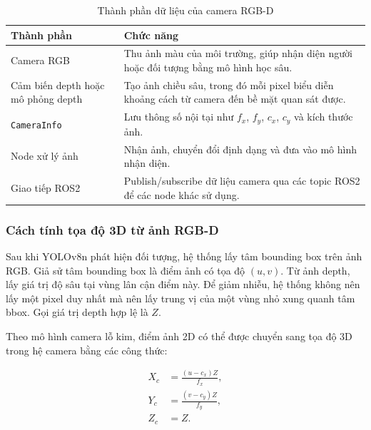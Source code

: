 \begin{table}[H]
    \centering
    \caption{Thành phần dữ liệu của camera RGB-D}
    \label{tab:rgbd-components}
    \renewcommand{\arraystretch}{1.25}
    \small
    \begin{tabularx}{\textwidth}{|>{\raggedright\arraybackslash}p{}|>{\raggedright\arraybackslash}X|}
        \hline
        \textbf{Thành phần} & \textbf{Chức năng} \\
        \hline
        Camera RGB & Thu ảnh màu của môi trường, giúp nhận diện người hoặc đối tượng bằng mô hình học sâu. \\
        \hline
        Cảm biến depth hoặc mô phỏng depth & Tạo ảnh chiều sâu, trong đó mỗi pixel biểu diễn khoảng cách từ camera đến bề mặt quan sát được. \\
        \hline
        \texttt{CameraInfo} & Lưu thông số nội tại như $f_x$, $f_y$, $c_x$, $c_y$ và kích thước ảnh. \\
        \hline
        Node xử lý ảnh & Nhận ảnh, chuyển đổi định dạng và đưa vào mô hình nhận diện. \\
        \hline
        Giao tiếp ROS2 & Publish/subscribe dữ liệu camera qua các topic ROS2 để các node khác sử dụng. \\
        \hline
    \end{tabularx}
\end{table}

\subsubsection{Cách tính tọa độ 3D từ ảnh RGB-D}
\label{subsubsec:rgbd-3d-calculation}

Sau khi YOLOv8n phát hiện đối tượng, hệ thống lấy tâm bounding box trên ảnh RGB. Giả sử tâm bounding box là điểm ảnh có tọa độ $(u, v)$. Từ ảnh depth, lấy giá trị độ sâu tại vùng lân cận điểm này. Để giảm nhiễu, hệ thống không nên lấy một pixel duy nhất mà nên lấy trung vị của một vùng nhỏ xung quanh tâm bbox. Gọi giá trị depth hợp lệ là $Z$.

Theo mô hình camera lỗ kim, điểm ảnh 2D có thể được chuyển sang tọa độ 3D trong hệ camera bằng các công thức:

\begin{align}
    X_c &= \frac{(u-c_x)Z}{f_x}, \label{eq:rgbd-xc}\\
    Y_c &= \frac{(v-c_y)Z}{f_y}, \label{eq:rgbd-yc}\\
    Z_c &= Z. \label{eq:rgbd-zc}
\end{align}

